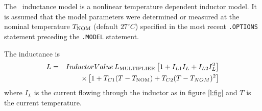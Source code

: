 The \pspice\ inductance model is a nonlinear temperature dependent inductor
model.  It is assumed that the model parameters were determined or
measured at the nominal temperature $T_{\mbox{\scriptsize NOM}}$ (default
$27^{\circ}C$) specified in the most recent {\tt .OPTIONS} statement
preceding the {\tt .MODEL} statement.

The inductance is
\begin{eqnarray}
L & = & InductorValue\,L_{\mbox{\scriptsize MULTIPLIER}}
  \left[ 1 + I_{L1} I_L + I_{L2} I_L^2 \right] \nonumber \\
&& \times
  \left[ 1 + T_{C1} (T-T_{\mbox{\scriptsize NOM}}) + T_{C2} (T-T_{NOM})^2 \right]
\end{eqnarray}
where $I_L$ is the current flowing through the inductor as in figure
\ref{l:fig} and $T$ is the current temperature.
